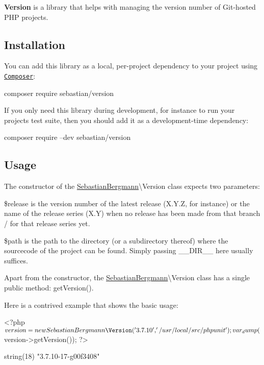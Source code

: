 {\bfseries Version} is a library that helps with managing the version number of Git-\/hosted P\+HP projects.

\subsection*{Installation}

You can add this library as a local, per-\/project dependency to your project using \href{https://getcomposer.org/}{\tt Composer}\+: \begin{DoxyVerb}composer require sebastian/version
\end{DoxyVerb}


If you only need this library during development, for instance to run your project\textquotesingle{}s test suite, then you should add it as a development-\/time dependency\+: \begin{DoxyVerb}composer require --dev sebastian/version
\end{DoxyVerb}


\subsection*{Usage}

The constructor of the {\ttfamily \mbox{\hyperlink{namespace_sebastian_bergmann}{Sebastian\+Bergmann}}\textbackslash{}Version} class expects two parameters\+:


\begin{DoxyItemize}
\item {\ttfamily \$release} is the version number of the latest release ({\ttfamily X.\+Y.\+Z}, for instance) or the name of the release series ({\ttfamily X.\+Y}) when no release has been made from that branch / for that release series yet.
\item {\ttfamily \$path} is the path to the directory (or a subdirectory thereof) where the sourcecode of the project can be found. Simply passing {\ttfamily \+\_\+\+\_\+\+D\+I\+R\+\_\+\+\_\+} here usually suffices.
\end{DoxyItemize}

Apart from the constructor, the {\ttfamily \mbox{\hyperlink{namespace_sebastian_bergmann}{Sebastian\+Bergmann}}\textbackslash{}Version} class has a single public method\+: {\ttfamily get\+Version()}.

Here is a contrived example that shows the basic usage\+: \begin{DoxyVerb}<?php
$version = new SebastianBergmann\Version(
  '3.7.10', '/usr/local/src/phpunit'
);

var_dump($version->getVersion());
?>

string(18) "3.7.10-17-g00f3408"
\end{DoxyVerb}


